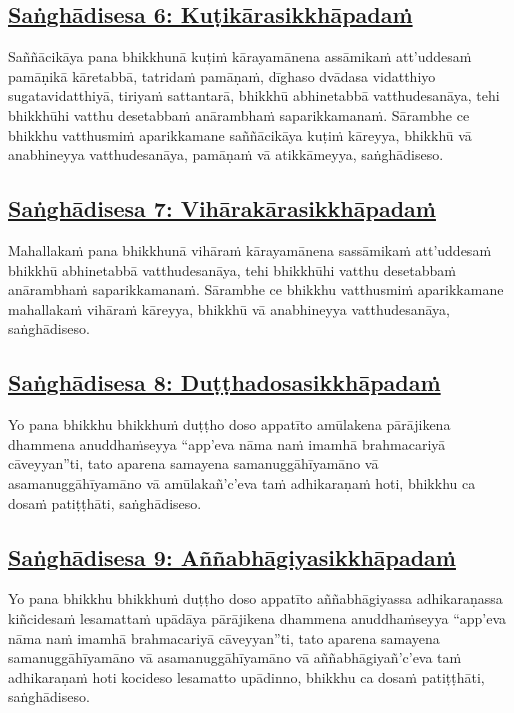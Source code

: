 \subsection*{\hyperref[comm6]{Saṅghādisesa 6: Kuṭikārasikkhāpadaṁ}}
\label{sd6}
Saññācikāya pana bhikkhunā kuṭiṁ kārayamānena assāmikaṁ att'uddesaṁ pamāṇikā kāretabbā, tatridaṁ pamāṇaṁ, dīghaso dvādasa vidatthiyo sugatavidatthiyā, tiriyaṁ sattantarā, bhikkhū abhinetabbā vatthudesanāya, tehi bhikkhūhi vatthu desetabbaṁ anārambhaṁ saparikkamanaṁ. Sārambhe ce bhikkhu vatthusmiṁ aparikkamane saññācikāya kuṭiṁ kāreyya, bhikkhū vā anabhineyya vatthudesanāya, pamāṇaṁ vā atikkāmeyya, saṅghādiseso.

\subsection*{\hyperref[comm7]{Saṅghādisesa 7: Vihārakārasikkhāpadaṁ}}
\label{sd7}
Mahallakaṁ pana bhikkhunā vihāraṁ kārayamānena sassāmikaṁ att'uddesaṁ bhikkhū abhinetabbā vatthudesanāya, tehi bhikkhūhi vatthu desetabbaṁ anārambhaṁ saparikkamanaṁ. Sārambhe ce bhikkhu vatthusmiṁ aparikkamane mahallakaṁ vihāraṁ kāreyya, bhikkhū vā anabhineyya vatthudesanāya, saṅghādiseso.

\subsection*{\hyperref[comm8]{Saṅghādisesa 8: Duṭṭhadosasikkhāpadaṁ}}
\label{sd8}
Yo pana bhikkhu bhikkhuṁ duṭṭho doso appatīto amūlakena pārājikena dhammena anuddhaṁseyya “app'eva nāma naṁ imamhā brahmacariyā cāveyyan''ti, tato aparena samayena samanuggāhīyamāno vā asamanuggāhīyamāno vā amūlakañ'c'eva taṁ adhikaraṇaṁ hoti, bhikkhu ca dosaṁ patiṭṭhāti, saṅghādiseso.

\subsection*{\hyperref[comm9]{Saṅghādisesa 9: Aññabhāgiyasikkhāpadaṁ}}
\label{sd9}
Yo pana bhikkhu bhikkhuṁ duṭṭho doso appatīto aññabhāgiyassa adhikaraṇassa kiñcidesaṁ lesamattaṁ upādāya pārājikena dhammena anuddhaṁseyya “app'eva nāma naṁ imamhā brahmacariyā cāveyyan''ti, tato aparena samayena samanuggāhīyamāno vā asamanuggāhīyamāno vā aññabhāgiyañ'c'eva taṁ adhikaraṇaṁ hoti kocideso lesamatto upādinno, bhikkhu ca dosaṁ patiṭṭhāti, saṅghādiseso.

